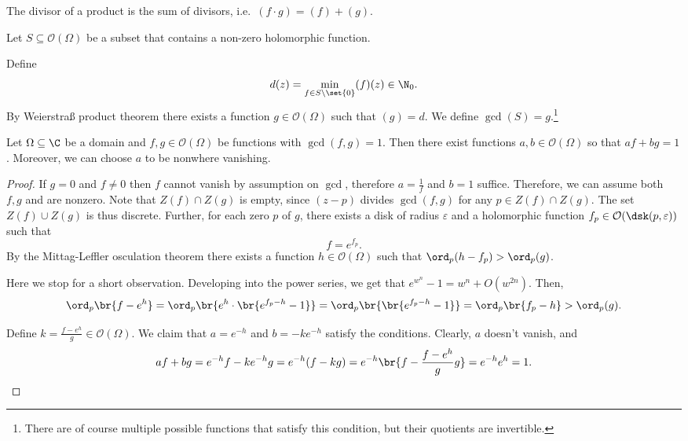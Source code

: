 \begin{opomba}
The divisor of a product is the sum of divisors,
i.e.~$(f \cdot g) = (f) + (g)$.
\end{opomba}

\begin{definicija}
Let $S \subseteq \mathcal{O}(\Omega)$ be a subset that contains a
non-zero holomorphic function.

Define
\[
d(z) = \min_{f \in S \setminus \set{0}} (f)(z) \in \N_0.
\]
By Weierstraß product theorem there exists a function
$g \in \mathcal{O}(\Omega)$ such that $(g) = d$. We define
$\gcd(S) = g$.\footnote{There are of
course multiple possible functions that satisfy this condition, but
their quotients are invertible.}
\end{definicija}


\begin{lema}[Wedderburn]
Let $\Omega \subseteq \C$ be a domain and
$f, g \in \mathcal{O}(\Omega)$ be functions with $\gcd(f, g) = 1$.
Then there exist functions $a, b \in \mathcal{O}(\Omega)$ so that
$a f + b g = 1$. Moreover, we can choose $a$ to be nonwhere
vanishing. 
\end{lema}

\begin{proof}
If $g = 0$ and $f \neq 0$ then $f$ cannot vanish by assumption on
$\gcd$, therefore $a = \frac{1}{f}$ and $b = 1$ suffice. Therefore,
we can assume both $f, g$ and are nonzero. Note that
$Z(f) \cap Z(g)$ is empty, since $(z - p)$ divides $\gcd(f, g)$ for
any $p \in Z(f) \cap Z(g)$. The set $Z(f) \cup Z(g)$ is thus
discrete. Further, for each zero $p$ of $g$, there exists a disk of
radius $\varepsilon$ and a holomorphic function
$f_p \in \mathcal{O}(\dsk(p, \varepsilon))$ such that
\[
f = e^{f_p}.
\]
By the Mittag-Leffler osculation theorem there exists a function
$h \in \mathcal{O}(\Omega)$ such that
$\ord_p(h - f_p) > \ord_p(g)$.

Here we stop for a short observation. Developing into the power
series, we get that $e^{w^n} - 1 = w^n + O(w^{2 n})$. Then, 
\[
\ord_p \br{f - e^h} =
\ord_p \br{e^h \cdot \br{e^{f_p - h} - 1}} =
\ord_p \br{\br{e^{f_p - h} - 1}} =
\ord_p \br{f_p - h} >
\ord_p(g).
\]

Define $k = \frac{f - e^h}{g} \in \mathcal{O}(\Omega)$. We claim
that $a = e^{-h}$ and $b = -k e^{-h}$ satisfy the conditions.
Clearly, $a$ doesn't vanish, and
\[
a f + b g =
e^{-h} f - k e ^{-h} g =
e^{-h}(f - k g) =
e^{- h} \br{f - \frac{f - e^h}{g} g} =
e^{-h} e^h =
1. \qedhere
\]
\end{proof}

